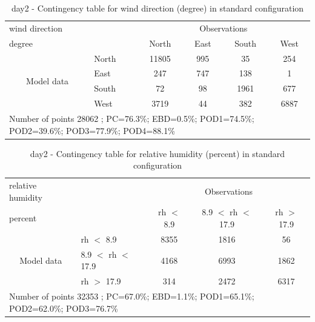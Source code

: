\begin{table}[p!]
\begin{center}
\begin{tabular}{llcccc}
\hline
{wind direction}                                       &                             &    \multicolumn{4}{c}{Observations}                 \\
{degree}                                       &                             & {North}   & {East} & {South} & {West} \\
\hline
\multicolumn{1}{c}{\multirow{4}{*}{Model data}}  & {North}                    & 11805   & 995    & 35     & 254\\
                                                 & {East}                     & 247   & 747    & 138     & 1\\
                                                 & {South}                    & 72   & 98   & 1961    & 677\\
                                                 & {West}                     & 3719  & 44   & 382    & 6887\\
\hline 
\multicolumn{6}{l}{ Number of points        28062 ; PC=76.3\%; EBD=0.5\%; POD1=74.5\%; POD2=39.6\%; POD3=77.9\%; POD4=88.1\%}                 \\
\end{tabular}
\end{center}
\caption{day2 - Contingency table for {wind direction} (degree) in standard configuration}
\label{tab:contingencywdBEF:day2}
\end{table}
\begin{table}[p!]
\begin{center}
\begin{tabular}{llccc}
\hline
{relative humidity}                                       &                                                    & \multicolumn{3}{c}{Observations}                 \\
{percent}                                       &                             & rh $<$ 8.9   & 8.9 $<$ rh $<$ 17.9 & rh $>$ 17.9 \\
\hline
\multicolumn{1}{c}{\multirow{3}{*}{Model data}}  & rh $<$ 8.9             & 8355                & 1816                       & 56              \\
                                                 & 8.9  $<$ rh $<$ 17.9 & 4168                & 6993                       & 1862              \\
                                                 & rh $>$ 17.9             & 314                & 2472                       & 6317              \\
\hline
\multicolumn{5}{l}{ Number of points        32353 ; PC=67.0\%; EBD=1.1\%; POD1=65.1\%; POD2=62.0\%; POD3=76.7\%}
\end{tabular}
\end{center}
\caption{day2 - Contingency table for  relative humidity (percent) in standard configuration}
\label{tab:contingencyrhBEF:day2}
\end{table}
